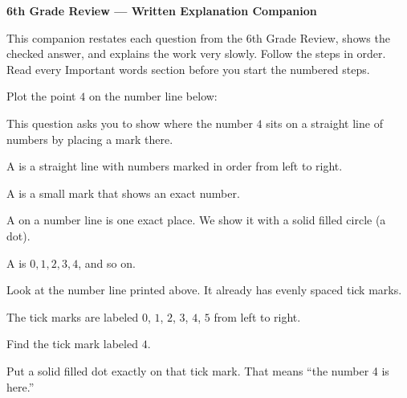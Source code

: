 
\begin{center}
  {\LARGE\bfseries 6th Grade Review --- Written Explanation Companion}
\end{center}
\medskip

\noindent This companion restates each question from the 6th Grade Review, shows
the checked answer, and explains the work very slowly. Follow the steps in order.
Read every Important words section before you start the numbered steps.



Plot the point $4$ on the number line below:



This question asks you to show where the number $4$ sits on a straight line of
numbers by placing a mark there.

\begin{words}
  \item A is a straight line with numbers marked in order from left to right.
  \item A is a small mark that shows an exact number.
  \item A on a number line is one exact place. We show it with a solid filled circle (a dot).
  \item A is $0, 1, 2, 3, 4$, and so on.
\end{words}

\begin{steps}
  \item Look at the number line printed above. It already has evenly spaced tick marks.
  \item The tick marks are labeled $0$, $1$, $2$, $3$, $4$, $5$ from left to right.
  \item Find the tick mark labeled $4$.
  \item Put a solid filled dot exactly on that tick mark. That means ``the number 4 is here.''
\end{steps}

